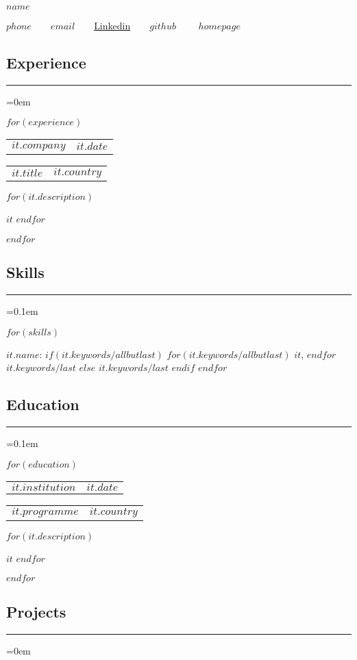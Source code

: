 \documentclass[10pt,letterpaper]{article}
\makeatletter
\newenvironment{indentsection}[1]%
{\begin{list}{}%
	{\setlength{\leftmargin}{#1}}%
	\item[]%
}
{\end{list}}
\def\sectionSpace{\vspace{-10pt}}
\newcommand\resumesection[1]
{\subsection*{#1}
\vspace{-0.2em}
\hrule
\vspace{0.4em}}
\newcommand{\headerrow}[2]
{\begin{tabular*}{\linewidth}{l@{\extracolsep{\fill}}r}
    #1 &
	#2 \\
\end{tabular*}}
\makeatother
\begin{document}
\begin{center}
{\LARGE \textbf{$name$}}
\vspace{0.4em}

$phone$\ \ \textbullet \ \
\href{mailto:$email$}{$email$}\ \ \textbullet \ \
\href{https://$linkedin$}{Linkedin}\ \ \textbullet \ \
\href{https://$github$}{$github$} \ \ \textbullet \ \
\href{https://$homepage$}{$homepage$}
\end{center}
\vspace{-16pt}

\resumesection{Experience}
\parskip=0em

    $for(experience)$
    \headerrow
		{\textbf{$it.company$}}
		{\textbf{$it.date$}}
	\vspace{-4pt}
	\headerrow
        {$it.title$}
		{$it.country$}
	\begin{itemize*}
        $for(it.description)$
	    \item $it$
        $endfor$
	\end{itemize*}
	\vspace{-2pt}
    $endfor$
    \sectionSpace

\resumesection{Skills}
\parskip=0.1em

	\begin{indentsection}{\parindent}
	\hyphenpenalty=1000
	\begin{description*}
        $for(skills)$
		\item[$it.name$:]
            $if(it.keywords/allbutlast)$
                $for(it.keywords/allbutlast)$
                    $it$,
                $endfor$
                $it.keywords/last$
            $else$
                $it.keywords/last$
            $endif$
        $endfor$
	\end{description*}
	\end{indentsection}
	\sectionSpace

\resumesection{Education}
\parskip=0.1em

    $for(education)$
	\headerrow
		{\textbf{$it.institution$}}
		{\textbf{$it.date$}}
	\vspace{-5pt}
	\headerrow
		{$it.programme$}
		{$it.country$}
    \begin{itemize*}
        $for(it.description)$
        \item $it$
        $endfor$
    \end{itemize*}
	\vspace{-2pt}
    $endfor$
	\sectionSpace

\resumesection{Projects}
\parskip=0em
\end{document}
